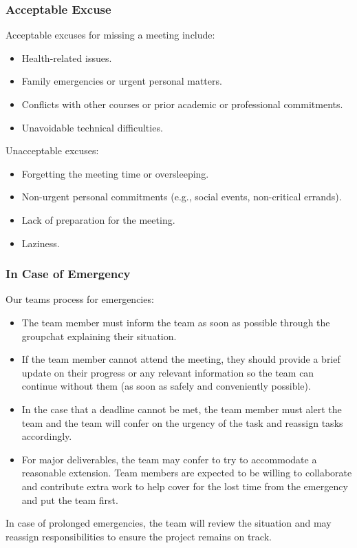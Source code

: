 \documentclass{article}
\begin{document}
\subsubsection*{Acceptable Excuse}
Acceptable excuses for missing a meeting include:
\begin{itemize}
  \item Health-related issues.
  \item Family emergencies or urgent personal matters.
  \item Conflicts with other courses or prior academic or professional commitments.
  \item Unavoidable technical difficulties.
\end{itemize}
Unacceptable excuses:
\begin{itemize}
  \item Forgetting the meeting time or oversleeping.
  \item Non-urgent personal commitments (e.g., social events, non-critical errands).
  \item Lack of preparation for the meeting.
  \item Laziness.
\end{itemize}
\subsubsection*{In Case of Emergency}
Our teams process for emergencies:
\begin{itemize}
    \item The team member must inform the team as soon as possible through the groupchat explaining their situation.
    \item If the team member cannot attend the meeting, they should provide a brief update on their progress or any relevant information so the team can continue without them (as soon as safely and conveniently possible).
    \item In the case that a deadline cannot be met, the team member must alert the team and the team will confer on the urgency of the task and reassign tasks accordingly.
    \item For major deliverables, the team may confer to try to accommodate a reasonable extension. Team members are expected to be willing to collaborate and contribute extra work to help cover for the lost time from the emergency and put the team first.
    
\end{itemize}
In case of prolonged emergencies, the team will review the situation and may reassign responsibilities to ensure the project remains on track.
\end{document}

